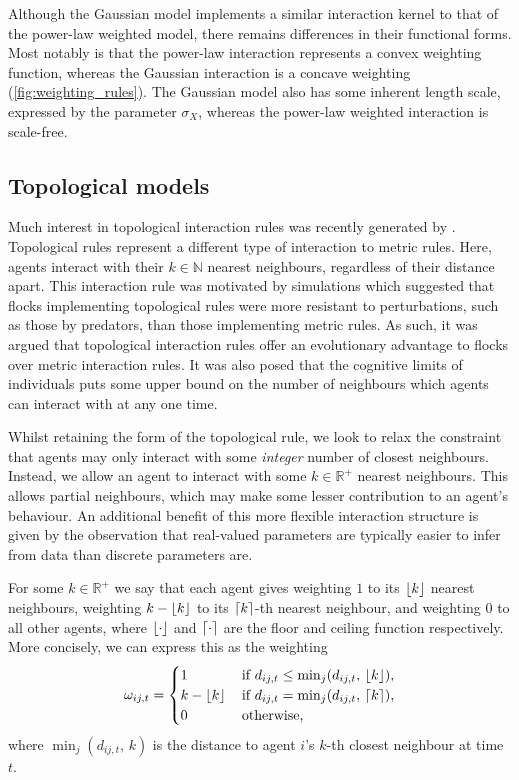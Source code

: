 Although the Gaussian model implements a similar interaction kernel to that of the
power-law weighted model, there remains differences in their functional forms.  Most
notably is that the power-law interaction represents a convex weighting function, whereas
the Gaussian interaction is a concave weighting (\cref{fig:weighting_rules}). The Gaussian
model also has some inherent length scale, expressed by the parameter $\sigma_X$, whereas
the power-law weighted interaction is scale-free.

\subsection{Topological models}

Much interest in topological interaction rules was recently generated by
\cite{ballerini08}. Topological rules represent a different type of interaction to metric
rules. Here, agents interact with their $k\in\mathbb{N}$ nearest neighbours, regardless of
their distance apart. This interaction rule was motivated by simulations which suggested
that flocks implementing topological rules were more resistant to perturbations, such as
those by predators, than those implementing metric rules. As such, it was argued that
topological interaction rules offer an evolutionary advantage to flocks over metric
interaction rules.
It was also posed that the cognitive limits of individuals puts some upper bound on the
number of neighbours which agents can interact with at any one time.

Whilst retaining the form of the topological rule, we look to relax the constraint that
agents may only interact with some \emph{integer} number of closest neighbours.  Instead,
we allow an agent to interact with some $k\in\mathbb{R}^+$ nearest neighbours.  This
allows partial neighbours, which may make some lesser contribution to an agent's
behaviour. An additional benefit of this more flexible interaction structure is given by
the observation that real-valued parameters are typically easier to infer from data than
discrete parameters are.

For some $k\in\mathbb{R}^+$ we say that each agent gives weighting $1$ to its $\lfloor k\rfloor$
nearest neighbours, weighting $k - \lfloor k\rfloor$ to its $\lceil k\rceil$-th nearest neighbour, and
weighting $0$ to all other agents, where $\lfloor\cdot\rfloor$ and $\lceil\cdot\rceil$ are the floor
and ceiling function respectively. More concisely, we can express this as the weighting
\begin{equation}
	\omega_{ij,t} =
	\begin{cases}
		1           & \, \text{if } d_{ij, t} \leq \min_j(d_{ij,t},\, \lfloor k\rfloor), \\
		k-\lfloor k\rfloor & \, \text{if } d_{ij, t} = \min_j(d_{ij,t},\, \lceil k\rceil),     \\
		0           & \, \text{otherwise,}
	\end{cases}
\end{equation}
where $\min_j(d_{ij,t},\, k)$ is the distance to agent $i$'s $k$-th closest neighbour at
time $t$. 

